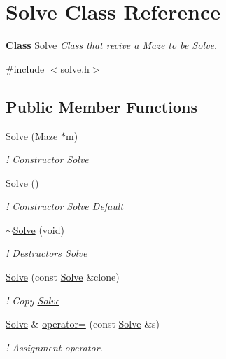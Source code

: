 \hypertarget{classSolve}{}\section{Solve Class Reference}
\label{classSolve}


{\bfseries Class} \hyperlink{classSolve}{Solve} {\itshape Class that recive a \hyperlink{classMaze}{Maze} to be \hyperlink{classSolve}{Solve}.}  




{\ttfamily \#include $<$solve.\+h$>$}

\subsection*{Public Member Functions}
\begin{DoxyCompactItemize}
\item 
\hyperlink{classSolve_a3aeaf8dfa8f2bb5f8fb4ec048b9afdb9}{Solve} (\hyperlink{classMaze}{Maze} $\ast$m)
\begin{DoxyCompactList}\small\item\em ! Constructor \hyperlink{classSolve}{Solve} \end{DoxyCompactList}\item 
\hyperlink{classSolve_ac437f1307c9d4669205ac7d370a55ffc}{Solve} ()
\begin{DoxyCompactList}\small\item\em ! Constructor \hyperlink{classSolve}{Solve} Default \end{DoxyCompactList}\item 
\hyperlink{classSolve_a3435d6ff721c2d8bebf0eff2411fa93e}{$\sim$\+Solve} (void)
\begin{DoxyCompactList}\small\item\em ! Destructors \hyperlink{classSolve}{Solve} \end{DoxyCompactList}\item 
\hyperlink{classSolve_ac78c2c56eb847decb6efd070978a9a3d}{Solve} (const \hyperlink{classSolve}{Solve} \&clone)
\begin{DoxyCompactList}\small\item\em ! Copy \hyperlink{classSolve}{Solve} \end{DoxyCompactList}\item 
\hyperlink{classSolve}{Solve} \& \hyperlink{classSolve_a2c0330bee4d1cafc5b3c7d5f7ba72697}{operator=} (const \hyperlink{classSolve}{Solve} \&s)
\begin{DoxyCompactList}\small\item\em ! Assignment operator. \end{DoxyCompactList}\item 

\end{DoxyCompactItemize}
